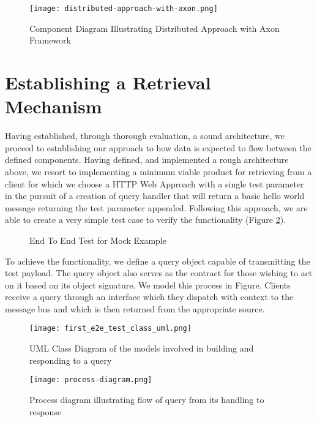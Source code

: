 \begin{figure}[h!]
	\centering
	\texttt{[image: distributed-approach-with-axon.png]}
	\caption{Component Diagram Illustrating Distributed Approach with Axon Framework}
	\label{fig:distributed-approach-with-axon}
\end{figure}

\section{Establishing a Retrieval Mechanism}

Having established, through thorough evaluation, a sound architecture, we proceed to establishing our approach to how data is expected to flow between the defined components. Having defined, and implemented a rough architecture above, we resort to implementing a minimum viable product for retrieving from a client for which we choose a HTTP Web Approach with a single test parameter in the pursuit of a creation of query handler that will return a basic hello world message returning the test parameter appended. Following this approach, we are able to create a very simple test case to verify the functionality (Figure \ref{fig:e2eMockTest}).

\begin{figure}[h!]
		\centering
		
		\caption{End To End Test for Mock Example}
		\label{fig:e2eMockTest}
\end{figure}

To achieve the functionality, we define a query object capable of transmitting the test payload. The query object also serves as the contract for those wishing to act on it based on its object signature. We model this process in Figure. Clients receive a query through an interface which they dispatch with context to the message bus and which is then returned from the appropriate source. 

\begin{figure}[h!]
	\centering
	\texttt{[image: first\_e2e\_test\_class\_uml.png]}
	\caption{UML Class Diagram of the models involved in building and responding to a query}
	\label{fig:firste2etestclassuml}
\end{figure}

\begin{figure}[h!]
	\centering
	\texttt{[image: process-diagram.png]}
	\caption{Process diagram illustrating flow of query from its handling to response}
	\label{fig:processSequenceQueryFlow}
\end{figure}

